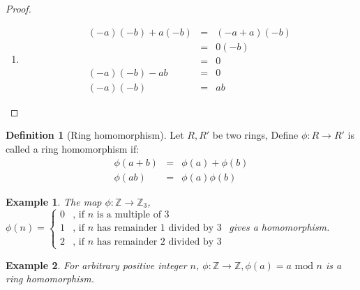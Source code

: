 \documentclass{article}
\theoremstyle{MyNonumberplain}
\theoremstyle{break}
\newtheorem*{proof}{Proof. }
\newcommand{\tmop}{\text}
\theoremstyle{break}
\newtheorem{example}{Example}[section]
\theoremstyle{break}
\theoremstyle{definition}
\theoremstyle{break}
\newtheorem{definition}{Definition}[section]
\begin{document}
\begin{thmbox}
\begin{prfbox}
\begin{proof}
\begin{enumerate}
                \item
                \begin{eqnarray*}
                    (- a) (- b) + a (- b) & = & (- a + a) (- b)\\
                    & = & 0 (- b)\\
                    & = & 0\\
                    (- a) (- b) - a b & = & 0\\
                    (- a) (- b) & = & a b
                  \end{eqnarray*}
            \end{enumerate}
        \end{proof}
    \end{prfbox}
\end{thmbox}

\begin{defbox}
    \begin{definition}[Ring homomorphism]
        Let $R, R'$ be two rings, Define $\phi : R \rightarrow R'$ is called a ring
        homomorphism if:
        \begin{eqnarray*}
          \phi (a + b) & = & \phi (a) + \phi (b)\\
          \phi (a b) & = & \phi (a) \phi (b)
        \end{eqnarray*}
    \end{definition}
\end{defbox}

\begin{expbox}
    \begin{example}
        The map $\phi : \mathbb{Z} \rightarrow \mathbb{Z}_3$, $\phi (n) =
        \left\{\begin{array}{ll}
          0 & \text{, if $n$ is a multiple of 3}\\
          1 & \text{, if $n$ has remainder 1 divided by 3}\\
          2 & \text{, if $n$ has remainder 2 divided by 3}
        \end{array}\right.$ gives a homomorphism.
    \end{example}
\end{expbox}

\begin{expbox}
    \begin{example}
        For arbitrary positive integer $n$, $\phi : \mathbb{Z} \rightarrow \mathbb{Z},
        \phi (a) = a \tmop{ mod } n$ is a ring homomorphism.
    \end{example}
\end{expbox}
\end{document}
